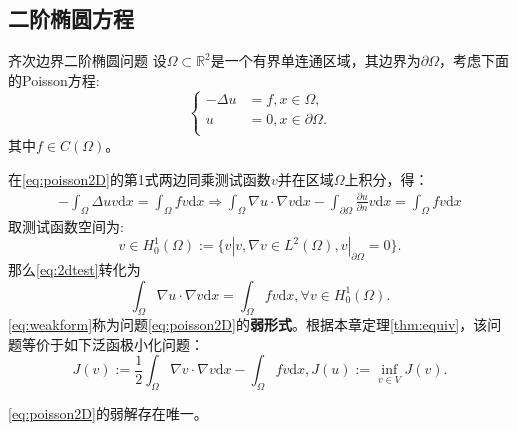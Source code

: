 \documentclass[lang=cn,10pt,newtx]{elegantbook}
\newcommand{\dif}{\mathrm{d}}
\newcommand{\pdfFrac}[2]{\frac{\partial #1}{\partial #2}}
\begin{document}
\subsection{二阶椭圆方程}
\begin{definition}{齐次边界二阶椭圆问题}
  设$\Omega\subset\mathbb{R}^{2}$是一个有界单连通区域，其边界为$\partial\Omega$，考虑下面的Poisson方程:
  \begin{equation}
    \label{eq:poisson2D}
    \left\{
      \begin{aligned}
        -\Delta u&=f,x\in\Omega,\\
        u&=0,x\in\partial\Omega.\\
      \end{aligned}
    \right.
  \end{equation}
  其中$f\in C(\Omega)$。
\end{definition}
在\eqref{eq:poisson2D}的第1式两边同乘测试函数$v$并在区域$\Omega$上积分，得：
\begin{equation}
  \label{eq:2dtest}
  \begin{aligned}
    -\int_{\Omega}\Delta uv\dif x=\int_{\Omega}fv\dif x\Rightarrow
    \int_{\Omega}\nabla u\cdot\nabla v\dif x-\int_{\partial\Omega}\pdfFrac{u}{n}v\dif x=\int_{\Omega}fv\dif x
  \end{aligned}
\end{equation}
取测试函数空间为:
\begin{equation}
  v\in H_{0}^{1}(\Omega):=\{v|v,\nabla v\in L^{2}(\Omega),v|_{\partial\Omega}=0\}.
\end{equation}
那么\eqref{eq:2dtest}转化为
\begin{equation}
  \label{eq:weakform}
  \int_{\Omega}\nabla u\cdot\nabla v\dif x=\int_{\Omega}fv\dif x,\forall v\in H_{0}^{1}(\Omega).
\end{equation}
\eqref{eq:weakform}称为问题\eqref{eq:poisson2D}的\textbf{弱形式}。根据本章定理\ref{thm:equiv}，该问题等价于如下泛函极小化问题：
\begin{equation}
  J(v):=\frac{1}{2}\int_{\Omega}\nabla v\cdot\nabla v\dif x-\int_{\Omega}fv\dif x,J(u):=\inf_{v\in V}J(v).
\end{equation}
\begin{theorem}
  \eqref{eq:poisson2D}的弱解存在唯一。
\end{theorem}
\end{document}
